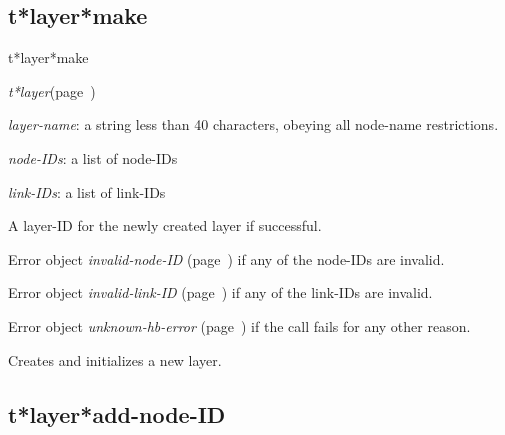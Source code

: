 \subsection{t*layer*make}
\label{t*layer*make}

\begin{description}
\item [Name:]  t*layer*make

\item [Class:] {\sl t*layer}\hfill(page~\pageref{t*layer})

\item [Parameters:]
\item {\sl layer-name}:  a string less than 40 characters, obeying
all node-name restrictions. 


\item {\sl node-IDs}:  a list of node-IDs


\item {\sl link-IDs}:  a list of link-IDs


\item [Return-value:]
A layer-ID for the newly created layer if successful.

Error object {\sl invalid-node-ID} (page~\pageref{invalid-node-ID}) if any of the node-IDs
are invalid.

Error object {\sl invalid-link-ID} (page~\pageref{invalid-link-ID}) if any of the link-IDs
are invalid.

Error object {\sl unknown-hb-error} (page~\pageref{unknown-hb-error}) if the call fails
for any other reason.

\item [Description:]

Creates and initializes a new layer. 

\item [Public:]



\end{description}
\horizontalline

\subsection{t*layer*add-node-ID}
\label{t*layer*add-node-ID}

